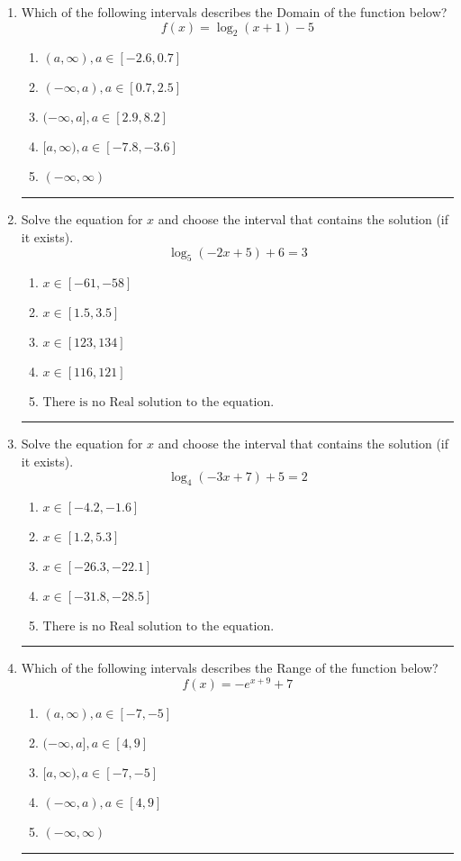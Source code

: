 \documentclass[14pt]{extbook}
\newcommand{\litem}[1]{\item#1\hspace*{-1cm}\rule{\textwidth}{0.4pt}}
\begin{document}
\begin{enumerate}
\litem{
Which of the following intervals describes the Domain of the function below?\[ f(x) = \log_2{(x+1)}-5 \]\begin{enumerate}[label=\Alph*.]
\item \( (a, \infty), a \in [-2.6, 0.7] \)
\item \( (-\infty, a), a \in [0.7, 2.5] \)
\item \( (-\infty, a], a \in [2.9, 8.2] \)
\item \( [a, \infty), a \in [-7.8, -3.6] \)
\item \( (-\infty, \infty) \)

\end{enumerate} }
\litem{
Solve the equation for $x$ and choose the interval that contains the solution (if it exists).\[ \log_{5}{(-2x+5)}+6 = 3 \]\begin{enumerate}[label=\Alph*.]
\item \( x \in [-61, -58] \)
\item \( x \in [1.5, 3.5] \)
\item \( x \in [123, 134] \)
\item \( x \in [116, 121] \)
\item \( \text{There is no Real solution to the equation.} \)

\end{enumerate} }
\litem{
Solve the equation for $x$ and choose the interval that contains the solution (if it exists).\[ \log_{4}{(-3x+7)}+5 = 2 \]\begin{enumerate}[label=\Alph*.]
\item \( x \in [-4.2, -1.6] \)
\item \( x \in [1.2, 5.3] \)
\item \( x \in [-26.3, -22.1] \)
\item \( x \in [-31.8, -28.5] \)
\item \( \text{There is no Real solution to the equation.} \)

\end{enumerate} }
\litem{
Which of the following intervals describes the Range of the function below?\[ f(x) = -e^{x+9}+7 \]\begin{enumerate}[label=\Alph*.]
\item \( (a, \infty), a \in [-7, -5] \)
\item \( (-\infty, a], a \in [4, 9] \)
\item \( [a, \infty), a \in [-7, -5] \)
\item \( (-\infty, a), a \in [4, 9] \)
\item \( (-\infty, \infty) \)


\end{enumerate}}
\end{enumerate}
\end{document}
